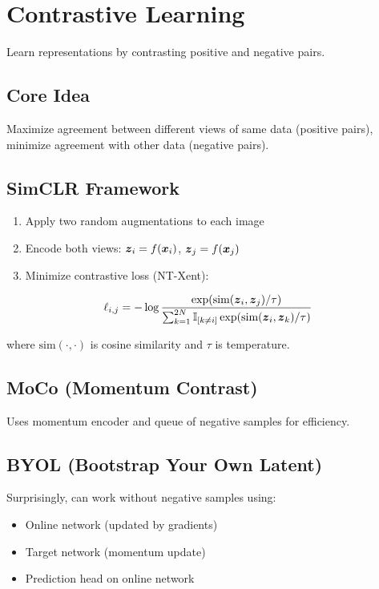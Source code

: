 
\section{Contrastive Learning}
\label{sec:contrastive-learning}

Learn representations by contrasting positive and negative pairs.

\subsection{Core Idea}

Maximize agreement between different views of same data (positive pairs), minimize agreement with other data (negative pairs).

\subsection{SimCLR Framework}

\begin{enumerate}
    \item Apply two random augmentations to each image
    \item Encode both views: $\boldsymbol{z}_i = f(\boldsymbol{x}_i)$, $\boldsymbol{z}_j = f(\boldsymbol{x}_j)$
    \item Minimize contrastive loss (NT-Xent):
\end{enumerate}

\begin{equation}
\ell_{i,j} = -\log \frac{\exp(\text{sim}(\boldsymbol{z}_i, \boldsymbol{z}_j)/\tau)}{\sum_{k=1}^{2N} \mathbb{I}_{[k \neq i]} \exp(\text{sim}(\boldsymbol{z}_i, \boldsymbol{z}_k)/\tau)}
\end{equation}

where $\text{sim}(\cdot, \cdot)$ is cosine similarity and $\tau$ is temperature.

\subsection{MoCo (Momentum Contrast)}

Uses momentum encoder and queue of negative samples for efficiency.

\subsection{BYOL (Bootstrap Your Own Latent)}

Surprisingly, can work without negative samples using:
\begin{itemize}
    \item Online network (updated by gradients)
    \item Target network (momentum update)
    \item Prediction head on online network
\end{itemize}


